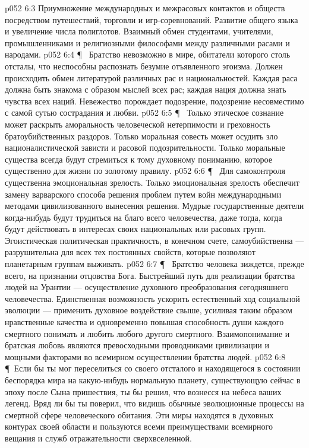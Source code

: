 \vs p052 6:3 \bibnobreakspace {} Приумножение международных и межрасовых контактов и обществ посредством путешествий, торговли и игр\hyp{}соревнований. Развитие общего языка и увеличение числа полиглотов. Взаимный обмен студентами, учителями, промышленниками и религиозными философами между различными расами и народами.
\vs p052 6:4 \P\ \bibnobreakspace {} Братство невозможно в мире, обитатели которого столь отсталы, что неспособны распознать безумие отъявленного эгоизма. Должен происходить обмен литературой различных рас и национальностей. Каждая раса должна быть знакома с образом мыслей всех рас; каждая нация должна знать чувства всех наций. Невежество порождает подозрение, подозрение несовместимо с самой сутью сострадания и любви.
\vs p052 6:5 \P\ \bibnobreakspace {} Только этическое сознание может раскрыть аморальность человеческой нетерпимости и греховность братоубийственных раздоров. Только моральная совесть может осудить зло националистической зависти и расовой подозрительности. Только моральные существа всегда будут стремиться к тому духовному пониманию, которое существенно для жизни по золотому правилу.
\vs p052 6:6 \P\ \bibnobreakspace {} Для самоконтроля существенна эмоциональная зрелость. Только эмоциональная зрелость обеспечит замену варварского способа решения проблем путем войн международными методами цивилизованного вынесения решения. Мудрые государственные деятели когда\hyp{}нибудь будут трудиться на благо всего человечества, даже тогда, когда будут действовать в интересах своих национальных или расовых групп. Эгоистическая политическая практичность, в конечном счете, самоубийственна --- разрушительна для всех тех постоянных свойств, которые позволяют планетарным группам выживать.
\vs p052 6:7 \P\ \bibnobreakspace {} Братство человека зиждется, прежде всего, на признании отцовства Бога. Быстрейший путь для реализации братства людей на Урантии --- осуществление духовного преобразования сегодняшнего человечества. Единственная возможность ускорить естественный ход социальной эволюции --- применить духовное воздействие свыше, усиливая таким образом нравственные качества и одновременно повышая способность души каждого смертного понимать и любить любого другого смертного. Взаимопонимание и братская любовь являются превосходными проводниками цивилизации и мощными факторами во всемирном осуществлении братства людей.
\vs p052 6:8 \P\ Если бы ты мог переселиться со своего отсталого и находящегося в состоянии беспорядка мира на какую\hyp{}нибудь нормальную планету, существующую сейчас в эпоху после Сына пришествия, ты бы решил, что вознесся на небеса ваших легенд. Вряд ли бы ты поверил, что видишь обычные эволюционные процессы на смертной сфере человеческого обитания. Эти миры находятся в духовных контурах своей области и пользуются всеми преимуществами всемирного вещания и служб отражательности сверхвселенной.
